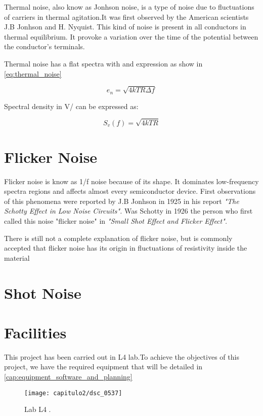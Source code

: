 Thermal noise, also know as Jonhson noise, is a type of noise due to fluctuations of carriers in thermal agitation.It was first observed by the American scientists J.B Jonhson and H. Nyquist. This kind of noise is present in all conductors in thermal equilibrium. It provoke a variation over the time of the potential between the conductor's terminals.

Thermal noise has a flat spectra with and expression as show in \ref{eq:thermal_noise}

\begin{equation}
e_{n}=\sqrt{4kTR\Delta f}
\label{eq:thermal_noise}
\end{equation}

Spectral density in V/ can be expressed as:

\begin{equation}
S_{v}(f)=\sqrt{4kTR}
\label{eq:espectral_thermal_noise}
\end{equation}

\section{Flicker Noise}

Flicker noise is know as 1/f noise because of its shape. It dominates low-frequency spectra regions and affects almost every semiconductor device. First observations of this phenomena were reported by J.B Jonhson in 1925 in his report \textit{"The Schotty Effect in Low Noise Circuits".} Was Schotty in 1926 the person who first called this noise "flicker noise" in \textit{"Small Shot Effect and Flicker Effect".}

There is still not a complete explanation of flicker noise, but is commonly accepted that flicker noise has its origin in fluctuations of resistivity inside the material

\section{Shot Noise}


\section{Facilities}

This project has been carried out in L4 lab.To achieve the objectives of this project, we have the required equipment that will be detailed in \ref{cap:equipment_software_and_planning}

\smallskip
\begin{figure}[H]%
\noindent \begin{centering}
\texttt{[image: capitulo2/dsc\_0537]}
\par\end{centering}
\smallskip
\caption{\label{fig:ejemplo_mesapuntas} Lab L4 \cite{MINSTPROBES}.}
\end{figure} 

